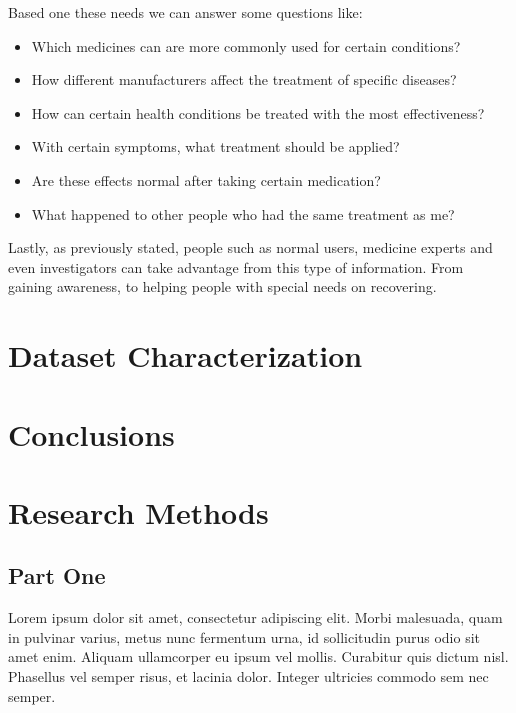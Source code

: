 \documentclass[sigconf]{acmart}
\begin{document}
Based one these needs we can answer some questions like: 
\begin{itemize}
	\item Which medicines can are more commonly used for certain conditions?
	\item How different manufacturers affect the treatment of specific diseases?
	\item How can certain health conditions be treated with the most effectiveness?
	\item With certain symptoms, what treatment should be applied?
	\item Are these effects normal after taking certain medication?
	\item What happened to other people who had the same treatment as me?
\end{itemize}

Lastly, as previously stated, people such as normal users, medicine experts and even investigators can take advantage from this type of information. From gaining awareness, to helping people with special needs on recovering.

\section{Dataset Characterization}

\section{Conclusions}





\appendix

\section{Research Methods}

\subsection{Part One}

Lorem ipsum dolor sit amet, consectetur adipiscing elit. Morbi
malesuada, quam in pulvinar varius, metus nunc fermentum urna, id
sollicitudin purus odio sit amet enim. Aliquam ullamcorper eu ipsum
vel mollis. Curabitur quis dictum nisl. Phasellus vel semper risus, et
lacinia dolor. Integer ultricies commodo sem nec semper.
\end{document}

